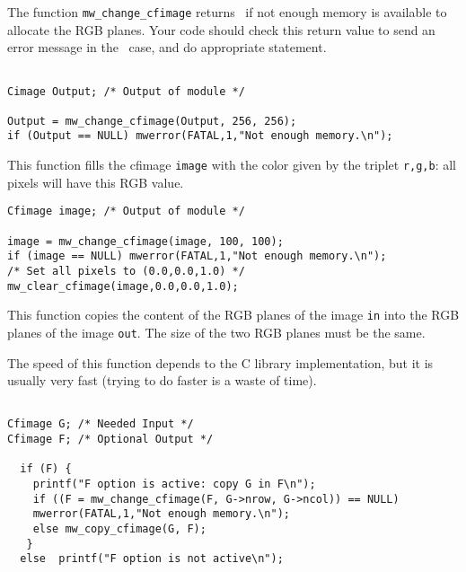 The function \verb+mw_change_cfimage+ returns \Null\ if not enough memory is available to allocate the RGB planes. Your code should check this return value to 
send an error message in the \Null\ case, and do appropriate statement.

\Next
\Example
\begin{verbatim}

Cimage Output; /* Output of module */

Output = mw_change_cfimage(Output, 256, 256);
if (Output == NULL) mwerror(FATAL,1,"Not enough memory.\n");

\end{verbatim}

\newpage %
\Description
This function fills the cfimage \verb+image+ with the color given by 
the triplet \verb+r,g,b+: all pixels will have this RGB value.

\Next
\Example
\begin{verbatim}
Cfimage image; /* Output of module */

image = mw_change_cfimage(image, 100, 100);
if (image == NULL) mwerror(FATAL,1,"Not enough memory.\n");
/* Set all pixels to (0.0,0.0,1.0) */
mw_clear_cfimage(image,0.0,0.0,1.0);

\end{verbatim}

\newpage %
\Description
This function copies the content of the RGB planes of the image \verb+in+ into 
the RGB planes of the image \verb+out+.
The size of the two RGB planes must be the same.

The speed of this function depends to the C library implementation, but it is
usually very fast (trying to do faster is a waste of time).

\Next
\Example
\begin{verbatim}

Cfimage G; /* Needed Input */
Cfimage F; /* Optional Output */

  if (F) {
    printf("F option is active: copy G in F\n");
    if ((F = mw_change_cfimage(F, G->nrow, G->ncol)) == NULL)
	mwerror(FATAL,1,"Not enough memory.\n");
    else mw_copy_cfimage(G, F);
   }
  else  printf("F option is not active\n");
\end{verbatim}

